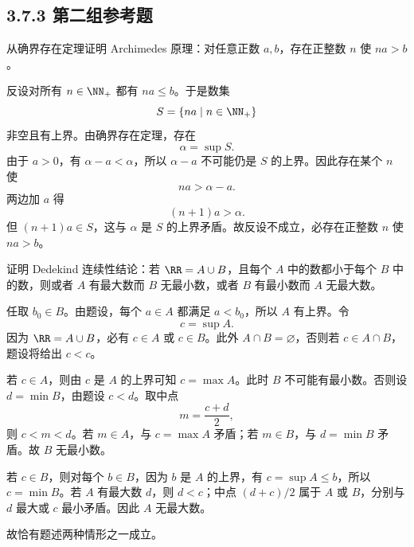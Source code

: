 \subsection*{3.7.3 第二组参考题}

\begin{xreferenceproblem}[第二组参考题 1]
从确界存在定理证明 Archimedes 原理：对任意正数 $a,b$，存在正整数 $n$ 使 $na>b$。
\end{xreferenceproblem}
\begin{xsolution}
反设对所有 $n\in\NN_+$ 都有 $na\leqslant b$。于是数集
\[
  S=\{na\mid n\in\NN_+\}
\]
非空且有上界。由确界存在定理，存在
\[
  \alpha=\sup S.
\]
由于 $a>0$，有 $\alpha-a<\alpha$，所以 $\alpha-a$ 不可能仍是 $S$ 的上界。因此存在某个 $n$ 使
\[
  na>\alpha-a.
\]
两边加 $a$ 得
\[
  (n+1)a>\alpha.
\]
但 $(n+1)a\in S$，这与 $\alpha$ 是 $S$ 的上界矛盾。故反设不成立，必存在正整数 $n$ 使 $na>b$。
\end{xsolution}

\begin{xreferenceproblem}[第二组参考题 2]
证明 Dedekind 连续性结论：若 $\RR=A\cup B$，且每个 $A$ 中的数都小于每个 $B$ 中的数，则或者 $A$ 有最大数而 $B$ 无最小数，或者 $B$ 有最小数而 $A$ 无最大数。
\end{xreferenceproblem}
\begin{xsolution}
任取 $b_0\in B$。由题设，每个 $a\in A$ 都满足 $a<b_0$，所以 $A$ 有上界。令
\[
  c=\sup A.
\]
因为 $\RR=A\cup B$，必有 $c\in A$ 或 $c\in B$。此外 $A\cap B=\varnothing$，否则若 $c\in A\cap B$，题设将给出 $c<c$。

若 $c\in A$，则由 $c$ 是 $A$ 的上界可知 $c=\max A$。此时 $B$ 不可能有最小数。否则设 $d=\min B$，由题设 $c<d$。取中点
\[
  m=\frac{c+d}{2},
\]
则 $c<m<d$。若 $m\in A$，与 $c=\max A$ 矛盾；若 $m\in B$，与 $d=\min B$ 矛盾。故 $B$ 无最小数。

若 $c\in B$，则对每个 $b\in B$，因为 $b$ 是 $A$ 的上界，有 $c=\sup A\leqslant b$，所以 $c=\min B$。若 $A$ 有最大数 $d$，则 $d<c$；中点 $(d+c)/2$ 属于 $A$ 或 $B$，分别与 $d$ 最大或 $c$ 最小矛盾。因此 $A$ 无最大数。

故恰有题述两种情形之一成立。
\end{xsolution}

